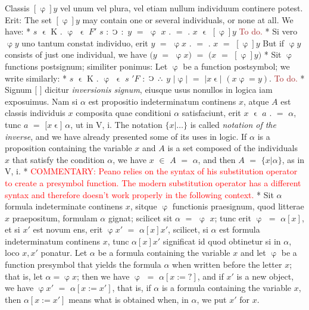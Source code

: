 \documentclass{book}
\newcommand{\C}{\mathop{\sbox0{$\displaystyle$$\reflectbox{C}$} %
\raisebox{-\height+\ht0-0.05cm}[\ht0][\dp0]{\scalebox{0.8}[0.8]{\copy0}}}\displaylimits} %
\newcommand{\pppNoSpace}{\leavevmode\lower0ex\hbox{.}\kern-0.1em\raise0.7ex\hbox{.}\kern-0.1em\lower0ex\hbox{.}} %
\newcommand{\smallIn}{\ensuremath{\mathrel{\epsilon}}}
\newcommand\commentary[1]{\textcolor{red}{COMMENTARY: #1}}
\newcommand\todo{\textcolor{brown}{To do.}}
\newenvironment{translateTwoCol}
               { %
                 \columnratio{0.5, 0.5} \begin{paracol}{2}
                 \newcommand{\LAT}{\switchcolumn[0]*}
                 \newcommand{\ENG}{\switchcolumn[1]}
               }
               { %
                 \let\ENG\undefined
                 \let\LAT\undefined
                 \end{paracol}
               }
\begin{document}
\begin{translateTwoCol}
Classis $[\upvarphi] y$ vel unum vel plura, vel etiam nullum individuum continere potest. Erit:
\ENG
The set $[\upvarphi] y$ may contain one or several individuals, or none at all. We have:
\LAT
\hspace{1.06cm} $s$ $\smallIn$ K $.$ $\upvarphi$ $\smallIn$ $F'$ $s$ $:$ $\C$ $:$ $y$ $=$ $\upvarphi$ $x$ $.$ $=$ $.$ $x$ $\smallIn$ $[\upvarphi] y$
\ENG
\todo
\LAT
Si vero $\upvarphi y$ uno tantum constat individuo, erit $y$ $=$ $\upvarphi x$ $.$ $=$ $.$ $x$ $=$ $[\upvarphi] y$
\ENG
But if $\upvarphi y$ consists of just one individual, we have $(y$ $=$ $\upvarphi x)$ $=$ $(x$ $=$ $[\upvarphi] y)$
\LAT
Sit $\upvarphi$ functions postsignum; similiter ponimus:
\ENG
Let $\upvarphi$ be a function postsymbol; we write similarly:
\LAT
\hspace{1.06cm} $s$ $\smallIn$ K $.$ $\upvarphi$ $\smallIn$ $s$ $'F$ $:$ $\C$ $\pppNoSpace$ $y$ $| \upvarphi |$ $=$ $| x\smallIn |$ $(x \upvarphi = y)$.
\ENG
\todo
\LAT
Signum $[$ $]$ dicitur \emph{inversionis signum}, eiusque usus nonullos in logica iam exposuimus. Nam si $\alpha$ est propositio indeterminatum continens $x$, atque $A$ est classis individuis $x$ composita quae conditioni $\alpha$ satisfaciunt, erit $x$ $\smallIn$ $a$ $.$ $=$ $\alpha$, tunc $a$ $=$ $[x$\smallIn$]$ $\alpha$, ut in V, i.
\ENG
The notation $\{ x | \ldots \}$ is called \emph{notation of the inverse}, and we have already presented some of its uses in logic. If $\alpha$ is a proposition containing the variable $x$ and $A$ is a set composed of the individuals $x$ that satisfy the condition $\alpha$, we have $x$ $\in$ $A$ $=$ $\alpha$, and then $A$ $=$ $\{ x | \alpha \}$, as in V, i. %
\LAT
\ENG
\commentary{Peano relies on the syntax of his substitution operator to create a presymbol function.  The modern substitution operator has a different syntax and therefore doesn't work properly in the following context.}
\LAT
Sit $\alpha$ formula indeterminate continens $x$, sitque $\upvarphi$ functionis praesignum, quod litterae $x$ praepositum, formulam $\alpha$ gignat; scilicet sit $\alpha$ $=$ $\upvarphi$ $x$; tunc erit $\upvarphi$ $=$ $\alpha [x]$, et si $x'$ est novum ens, erit $\upvarphi x'$ $=$ $\alpha [x] x'$, scilicet, si $\alpha$ est formula indeterminatum continens $x$, tunc $\alpha [x] x'$ significat id quod obtinetur si in $\alpha$, loco $x, x'$ ponatur.
\ENG
Let $\alpha$ be a formula containing the variable $x$ and let $\upvarphi$ be a function presymbol that yields the formula $\alpha$ when written before the letter $x$; that is, let $\alpha = \upvarphi x$; then we have $\upvarphi$ $=$ $\alpha [x := ? ]$, and if $x'$ is a new object, we have $\upvarphi x'$ $=$ $\alpha [x := x']$, that is, if $\alpha$ is a formula containing the variable $x$, then $\alpha[x := x']$ means what is obtained when, in $\alpha$, we put $x'$ for $x$.

\end{translateTwoCol}
\end{document}
